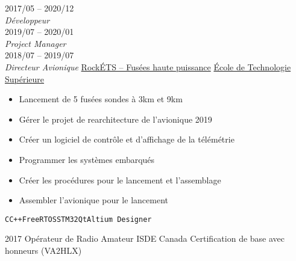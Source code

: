 \documentclass[9pt]{developercv} %
\begin{document}
\begin{minipage}[t]{0.8\textwidth}
\begin{entrylist}
	\entry
		{2017/05 -- 2020/12\\{\small\emph{Développeur}}\\2019/07 -- 2020/01\\{\small\emph{Project Manager}}\\2018/07 -- 2019/07\\{\small\emph{Directeur Avionique}}}
		{\href{https://clubrockets.ca/}{RockÉTS -- Fusées haute puissance}}
		{\href{https://clubrockets.ca/}{École de Technologie Supérieure}}
		{
			\vspace{-14pt}
			\begin{itemize}
				\renewcommand{\labelitemi}{\raisebox{.45ex}{\rule{.6ex}{.6ex}}}
				\setlength\itemsep{-1pt}
				\item Lancement de 5 fusées sondes à 3km et 9km
				\item Gérer le projet de rearchitecture de l'avionique 2019
				\item Créer un logiciel de contrôle et d'affichage de la télémétrie
				\item Programmer les systèmes embarqués
				\item Créer les procédures pour le lancement et l'assemblage
				\item Assembler l'avionique pour le lancement
			\end{itemize}
			\vspace{-4pt}
			\texttt{C}\slashsep\texttt{C++}\slashsep\texttt{FreeRTOS}\slashsep\texttt{STM32}\slashsep\texttt{Qt}\slashsep\texttt{Altium Designer}
		}
\end{entrylist}



\begin{entrylist}
	\entry
		{2017}
		{Opérateur de Radio Amateur}
		{ISDE Canada}
		{
			Certification de base avec honneurs (VA2HLX)
		}
\end{entrylist}
\end{minipage}
\begin{minipage}[t]{0.02\textwidth}
	\hfill
\end{minipage}
\end{document}
